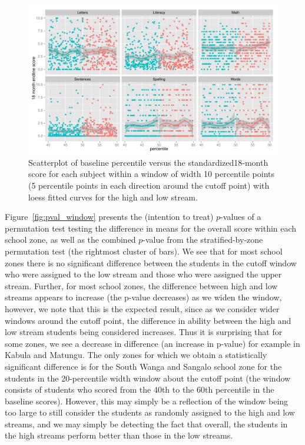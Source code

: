 \documentclass[11pt]{article}
\begin{document}
  \begin{figure}[ht]
 \centering
 \includegraphics[scale=0.65]{RD_scatter_subject.pdf}
 \caption{Scatterplot of baseline percentile versus the standardized18-month score for each subject within a window of width 10 percentile points (5 percentile points in each direction around the cutoff point) with loess fitted curves for the high and low stream.}
 \label{fig:RD_scatter_subject}
 \end{figure}



Figure~\ref{fig:pval_window} presents the (intention to treat) $p$-values of a permutation test testing the difference in means for the overall score within each school zone, as well as the combined $p$-value from the stratified-by-zone permutation test (the rightmost cluster of bars). We see that for most school zones there is no significant difference between the students in the cutoff window who were assigned to the low stream and those who were assigned the upper stream. Further, for most school zones, the difference between high and low streams appears to increase (the p-value decreases) as we widen the window, however, we note that this is the expected result, since as we consider wider windows around the cutoff point, the difference in ability between the high and low stream students being considered increases. Thus it is surprising that for some zones, we see a decrease in difference (an increase in p-value) for example in Kabula and Matungu. The only zones for which we obtain a statistically significant difference is for the South Wanga and Sangalo school zone for the students in the 20-percentile width window about the cutoff point (the window consists of students who scored from the 40th to the 60th percentile in the baseline scores). However, this may simply be a reflection of the window being too large to still consider the students as randomly assigned to the high and low streams, and we may simply be detecting the fact that overall, the students in the high streams perform better than those in the low streams. 
 
\end{document}
